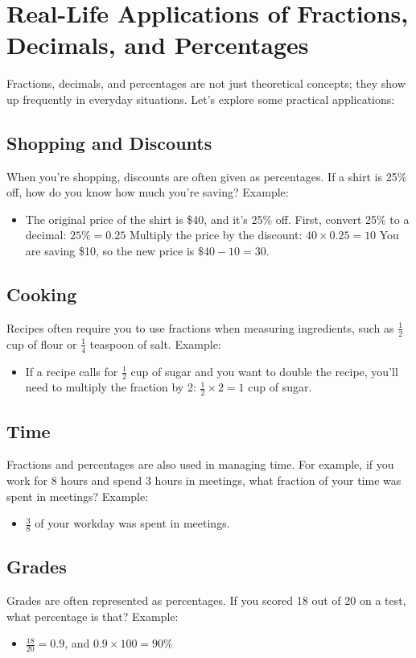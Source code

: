 \section{Real-Life Applications of Fractions, Decimals, and Percentages}
Fractions, decimals, and percentages are not just theoretical concepts; they show up frequently in everyday situations. Let’s explore some practical applications:

\subsection{Shopping and Discounts}
When you're shopping, discounts are often given as percentages. If a shirt is 25\% off, how do you know how much you're saving? Example:
\begin{itemize}
    \item The original price of the shirt is \$40, and it’s 25\% off. First, convert 25\% to a decimal: $25\% = 0.25$ Multiply the price by the discount: $40 \times 0.25 = 10$ You are saving \$10, so the new price is $\$40 - 10 = 30$.
\end{itemize}

\subsection{Cooking}
Recipes often require you to use fractions when measuring ingredients, such as $\frac{1}{2}$ cup of flour or $\frac{1}{4}$ teaspoon of salt. Example:
\begin{itemize}
    \item If a recipe calls for $\frac{1}{2}$ cup of sugar and you want to double the recipe, you’ll need to multiply the fraction by 2: $\frac{1}{2} \times 2 = 1$ cup of sugar.
\end{itemize}

\subsection{Time}
Fractions and percentages are also used in managing time. For example, if you work for 8 hours and spend 3 hours in meetings, what fraction of your time was spent in meetings? Example:
\begin{itemize}
    \item $\frac{3}{8}$ of your workday was spent in meetings.
\end{itemize}

\subsection{Grades}
Grades are often represented as percentages. If you scored 18 out of 20 on a test, what percentage is that? Example:
\begin{itemize}
    \item $\frac{18}{20} = 0.9$, and $0.9 \times 100 = 90\%$
\end{itemize}

